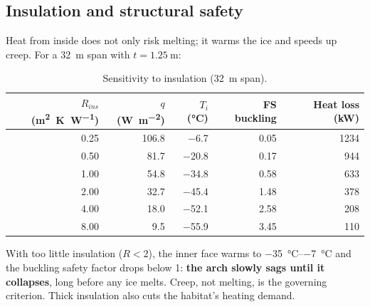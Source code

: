 \documentclass[11pt,a4paper]{article}
\begin{document}
\subsection{Insulation and structural safety}
Heat from inside does not only risk melting; it warms the ice and speeds up creep. For a \SI{32}{\metre} span with $t=\SI{1.25}{\metre}$:
\begin{table}[h]\centering\small
\caption{Sensitivity to insulation (\SI{32}{\metre} span).}
\begin{tabular}{rrrrr}\toprule
$R_{ins}$ (\si{\metre\squared\kelvin\per\watt}) & $q$ (\si{\watt\per\metre\squared}) & $T_i$ (\si{\celsius}) & FS buckling & Heat loss (\si{\kilo\watt}) \\\midrule
\num{0.25} & \num{106.8} & \num{-6.7} & \num{0.05} & \num{1234} \\
\num{0.50} & \num{81.7} & \num{-20.8} & \num{0.17} & \num{944} \\
\num{1.00} & \num{54.8} & \num{-34.8} & \num{0.58} & \num{633} \\
\num{2.00} & \num{32.7} & \num{-45.4} & \num{1.48} & \num{378} \\
\num{4.00} & \num{18.0} & \num{-52.1} & \num{2.58} & \num{208} \\
\num{8.00} & \num{9.5} & \num{-55.9} & \num{3.45} & \num{110} \\
\bottomrule\end{tabular}
\end{table}
With too little insulation ($R<2$), the inner face warms to \SIrange{-35}{-7}{\celsius} and the buckling safety factor drops below 1: \textbf{the arch slowly sags until it collapses}, long before any ice melts. Creep, not melting, is the governing criterion. Thick insulation also cuts the habitat's heating demand.
\end{document}
